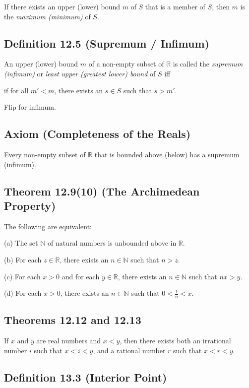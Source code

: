 \documentclass{book}
\begin{document}
If there exists an upper (lower) bound $m$ of $S$ that is a member of $S$, then $m$ is the \emph{maximum (minimum)} of $S$. 

\subsection*{Definition 12.5 (Supremum / Infimum)}

An upper (lower) bound $m$ of a non-empty subset of $   \mathbb{R}$ is called the \emph{supremum (infimum)} or \emph{least upper (greatest lower) bound} of $S$ iff

if for all $m' < m$, there exists an $s \in S$ such that $s > m'$. 

Flip for infimum. 

\subsection*{Axiom (Completeness of the Reals)}

Every non-empty subset of $\mathbb{R}$ that is bounded above (below) has a supremum (infimum). 

\subsection*{Theorem 12.9(10) (The Archimedean Property)}

The following are equivalent: 

(a) The set $\mathbb{N}$ of natural numbers is unbounded above in $\mathbb{R}$. 

(b) For each $z \in \mathbb{R}$, there exists an $n \in \mathbb{N}$ such that $n > z$. 

(c) For each $x > 0$ and for each $y \in \mathbb{R}$, there exists an $n \in \mathbb{N}$ such that $nx > y$. 

(d) For each $x > 0$, there exists an $n \in \mathbb{N}$ such that $0 < \frac{1}{n} < x$. 

\subsection*{Theorems 12.12 and 12.13}

If $x$ and $y$ are real numbers and $x < y$, then there exists both an irrational number $i$ such that 
$x < i < y$, and a rational number $r$ such that $x < r < y$. 

\subsection*{Definition 13.3 (Interior Point)}
\end{document}
